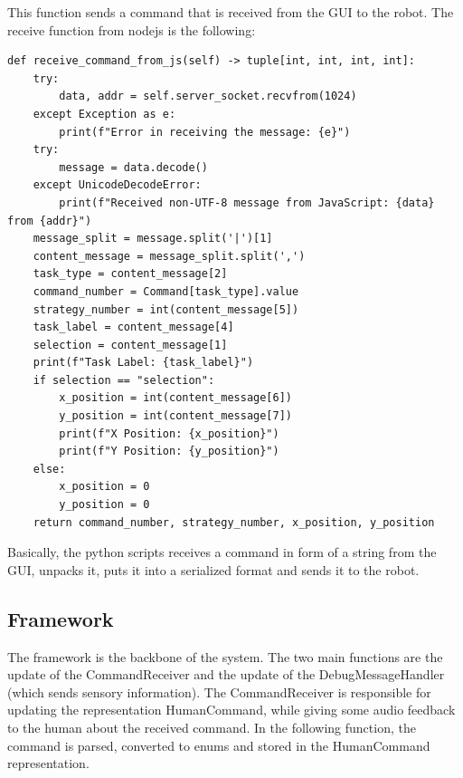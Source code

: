 \documentclass[a4paper, onecolumn, 12pt]{article}
\begin{document}
This function sends a command that is received from the GUI to the robot. The
receive function from nodejs is the following:

\begin{verbatim}
def receive_command_from_js(self) -> tuple[int, int, int, int]:
    try:
        data, addr = self.server_socket.recvfrom(1024)
    except Exception as e:
        print(f"Error in receiving the message: {e}")
    try:
        message = data.decode()
    except UnicodeDecodeError:
        print(f"Received non-UTF-8 message from JavaScript: {data} from {addr}")
    message_split = message.split('|')[1]
    content_message = message_split.split(',')
    task_type = content_message[2]
    command_number = Command[task_type].value
    strategy_number = int(content_message[5])
    task_label = content_message[4]
    selection = content_message[1]
    print(f"Task Label: {task_label}")
    if selection == "selection":
        x_position = int(content_message[6])
        y_position = int(content_message[7])
        print(f"X Position: {x_position}")
        print(f"Y Position: {y_position}")
    else:
        x_position = 0
        y_position = 0
    return command_number, strategy_number, x_position, y_position
\end{verbatim}
Basically, the python scripts receives a command in form of a string from the
GUI, unpacks it, puts it into a serialized format and sends it to the robot.


\subsection{Framework}

The framework is the backbone of the system. The two main functions are the
update of the CommandReceiver and the update of the DebugMessageHandler (which
sends sensory information). The CommandReceiver is responsible for updating the
representation HumanCommand, while giving some audio feedback to the human about
the received command. In the following function, the command is parsed,
converted to enums and stored in the HumanCommand representation. 
\end{document}
